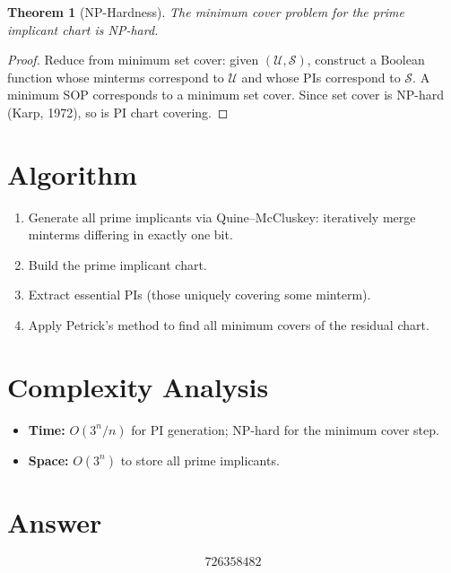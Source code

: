 \documentclass[11pt]{article}
\newtheorem{theorem}{Theorem}
\begin{document}
\begin{theorem}[NP-Hardness]
The minimum cover problem for the prime implicant chart is NP-hard.
\end{theorem}
\begin{proof}
Reduce from minimum set cover: given $(\mathcal{U}, \mathcal{S})$, construct a Boolean
function whose minterms correspond to $\mathcal{U}$ and whose PIs correspond to
$\mathcal{S}$. A minimum SOP corresponds to a minimum set cover. Since set cover
is NP-hard (Karp, 1972), so is PI chart covering.
\end{proof}

\section{Algorithm}
\begin{enumerate}
\item Generate all prime implicants via Quine--McCluskey: iteratively merge minterms
      differing in exactly one bit.
\item Build the prime implicant chart.
\item Extract essential PIs (those uniquely covering some minterm).
\item Apply Petrick's method to find all minimum covers of the residual chart.
\end{enumerate}

\section{Complexity Analysis}
\begin{itemize}
\item \textbf{Time:} $O(3^n/n)$ for PI generation; NP-hard for the minimum cover step.
\item \textbf{Space:} $O(3^n)$ to store all prime implicants.
\end{itemize}

\section{Answer}

\[
\boxed{726358482}
\]
\end{document}
